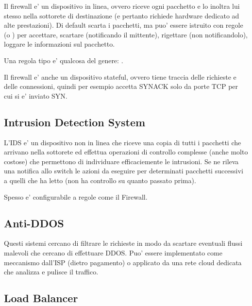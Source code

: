 Il firewall e' un dispositivo in linea, ovvero riceve ogni pacchetto e lo inoltra lui stesso nella sottorete di destinazione (e pertanto richiede hardware dedicato ad alte prestazioni). Di default scarta i pacchetti, ma puo' essere istruito con regole (o ) per accettare, scartare (notificando il mittente), rigettare (non notificandolo), loggare le informazioni sul pacchetto.

Una regola tipo e' qualcosa del genere: .

Il firewall e' anche un dispositivo stateful, ovvero tiene traccia delle richieste e delle connessioni, quindi per esempio accetta SYNACK solo da porte TCP per cui si e' inviato SYN.


\subsection{Intrusion Detection System}

L'IDS e' un dispositivo non in linea che riceve una copia di tutti i pacchetti che arrivano nella sottorete ed effettua operazioni di controllo complesse (anche molto costose) che permettono di individuare efficaciemente le intrusioni. Se ne rileva una notifica allo switch le azioni da eseguire per determinati pacchetti successivi a quelli che ha letto (non ha controllo su quanto passato prima).


Spesso e' configurabile a regole come il Firewall.


\subsection{Anti-DDOS}

Questi sistemi cercano di filtrare le richieste in modo da scartare eventuali flussi malevoli che cercano di effettuare DDOS. Puo' essere implementato come meccanismo dall'ISP (dietro pagamento) o applicato da una rete cloud dedicata che analizza e pulisce il traffico.


\subsection{Load Balancer}

